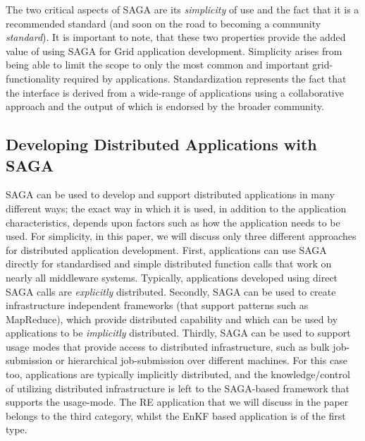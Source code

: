 \documentclass{llncs}
\begin{document}
The two critical aspects of SAGA are its {\it simplicity} of use and
the fact that it is a recommended standard (and soon on the road to
becoming a community {\it standard}).  It is important to note, that
these two properties provide the added value of using SAGA for Grid
application development.  Simplicity arises from being able to limit
the scope to only the most common and important grid-functionality
required by applications.  Standardization represents the fact that
the interface is derived from a wide-range of applications using a
collaborative approach and the output of which is endorsed by the
broader community.

\up

\subsection{Developing Distributed Applications with SAGA}

\up

SAGA can be used to develop and support distributed applications in
many different ways; the exact way in which it is used, in addition to
the application characteristics, depends upon factors such as how the
application needs to be used. For simplicity, in this paper, we will
discuss only three different approaches for distributed application
development.  First, applications can use SAGA directly for
standardised and simple distributed function calls that work on nearly
all middleware systems. Typically, applications developed using direct
SAGA calls are {\it explicitly} distributed.  Secondly, SAGA can be
used to create infrastructure independent frameworks (that support
patterns such as MapReduce), which provide distributed capability and
which can be used by applications to be {\it implicitly}
distributed. Thirdly, SAGA can be used to support usage modes that
provide access to distributed infrastructure, such as bulk
job-submission or hierarchical job-submission over different
machines. For this case too, applications are typically implicitly
distributed, and the knowledge/control of utilizing distributed
infrastructure is left to the SAGA-based framework that supports the
usage-mode. The RE application that we will discuss in the paper
belongs to the third category, whilst the EnKF based application is of
the first type.

\end{document}
